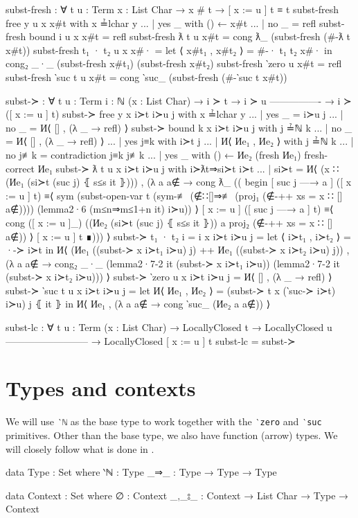 \begin{code}
  subst-fresh : ∀ {t u : Term} {x : List Char}
    → x # t
    → [ x := u ] t ≡ t
  subst-fresh {free y} {u} {x} x#t with x ≟lchar y
  ... | yes _ with () ← x#t
  ... | no  _ = refl
  subst-fresh {bound i} {u} {x} x#t = refl
  subst-fresh {ƛ t} {u} x#t =
    cong ƛ_ (subst-fresh (#-ƛ t x#t))
  subst-fresh {t₁ · t₂} {u} {x} x#· =
    let ⟨ x#t₁ , x#t₂ ⟩ = #-· t₁ t₂ x#· in
      cong₂ _·_ (subst-fresh x#t₁) (subst-fresh x#t₂)
  subst-fresh {‵zero} {u} x#t = refl
  subst-fresh {‵suc t} {u} x#t =
    cong ‵suc_ (subst-fresh (#-‵suc t x#t))

  subst-≻ : ∀ {t u : Term} {i : ℕ} (x : List Char)
    → i ≻ t
    → i ≻ u
      ----------------
    → i ≻ ([ x := u ] t)
  subst-≻ {free y} x i≻t i≻u j with x ≟lchar y
  ... | yes _ = i≻u j
  ... | no  _ = И⟨ [] , (λ _ → refl) ⟩
  subst-≻ {bound k} x i≻t i≻u j with j ≟ℕ k
  ... | no  _   = И⟨ [] , (λ _ → refl) ⟩
  ... | yes j≡k with i≻t j
  ...   | И⟨ Иe₁ , Иe₂ ⟩ with j ≟ℕ k
  ...     | no  j≢k = contradiction j≡k j≢k
  ...     | yes _   with () ← Иe₂ (fresh Иe₁) {fresh-correct Иe₁}
  subst-≻ {ƛ t} {u} x i≻t i≻u j with i≻ƛt⇒si≻t i≻t
  ... | si≻t =
    И⟨ (x ∷ (Иe₁ (si≻t (suc j) ⦃ s≤s it ⦄)))
    , (λ a {a∉} → cong ƛ_ ((
      begin
        [ suc j —→ a ] ([ x := u ] t)
      ≡⟨ sym (subst-open-var
            t
            (sym-≢ (∉∷[]⇒≢ (proj₁ (∉-++ {xs = x ∷ []} a∉))))
            (lemma2·6 (m≤n⇒m≤1+n it) i≻u)) ⟩
        [ x := u ] ([ suc j —→ a ] t)
      ≡⟨ cong ([ x := u ]_)
          ((Иe₂ (si≻t (suc j) ⦃ s≤s it ⦄))
            a
            {proj₂ (∉-++ {xs = x ∷ []} a∉)}) ⟩
        [ x := u ] t
      ∎))) ⟩
  subst-≻ {t₁ · t₂} {i = i} x i≻t i≻u j =
    let ⟨ i≻t₁ , i≻t₂ ⟩ = ·-≻ i≻t in
      И⟨ (Иe₁ ((subst-≻ x i≻t₁ i≻u) j)
        ++ Иe₁ ((subst-≻ x i≻t₂ i≻u) j))
      , (λ a {a∉} → cong₂ _·_
          (lemma2·7-2 it (subst-≻ x i≻t₁ i≻u))
          (lemma2·7-2 it (subst-≻ x i≻t₂ i≻u))) ⟩
  subst-≻ {‵zero} {u} x i≻t i≻u j = И⟨ [] , (λ _ → refl) ⟩
  subst-≻ {‵suc t} {u} x i≻t i≻u j =
    let И⟨ Иe₁ , Иe₂ ⟩ = (subst-≻ {t} x (‵suc-≻ i≻t) i≻u) j ⦃ it ⦄
      in И⟨ Иe₁ , (λ a {a∉} → cong ‵suc_ (Иe₂ a {a∉})) ⟩

  subst-lc : ∀ {t u : Term} (x : List Char)
    → LocallyClosed t
    → LocallyClosed u
      --------------------------
    → LocallyClosed [ x := u ] t
  subst-lc = subst-≻
\end{code}

\section{Types and contexts}
\label{appendix:typing_stlc}
We will use \texttt{‵ℕ} as the base type to work together with the
\texttt{‵zero} and \texttt{‵suc} primitives. Other than the base type, we also have function (arrow)
types. We will closely follow what is done in \citet{wadler_programming_2022}.
\begin{code}
  data Type : Set where
    ‵ℕ : Type
    _⇒_ : Type → Type → Type

  data Context : Set where
    ∅ : Context
    _,_⦂_ : Context → List Char → Type → Context
\end{code}

